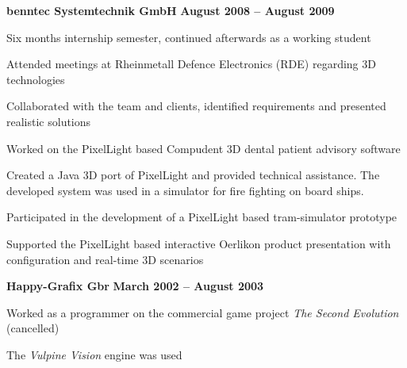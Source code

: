 \documentclass[margin,line]{Ofenberg_Resume}
\begin{document}
\begin{resume}
	\textbf{benntec Systemtechnik GmbH} \hfill \textbf{August 2008 -- August 2009}\vspace{-3mm}\\\vspace{-1mm}%
	\begin{list2}
		\item Six months internship semester, continued afterwards as a working student
		\item Attended meetings at Rheinmetall Defence Electronics (RDE) regarding 3D technologies
		\item Collaborated with the team and clients, identified requirements and presented realistic solutions
		\item Worked on the PixelLight based Compudent 3D dental patient advisory software
		\item Created a Java 3D port of PixelLight and provided technical assistance. The developed system was used in a simulator for fire fighting on board ships.
		\item Participated in the development of a PixelLight based tram-simulator prototype
		\item Supported the PixelLight based interactive Oerlikon product presentation with configuration and real-time 3D scenarios
	\end{list2}\vspace{-1.5mm}
	\textbf{Happy-Grafix Gbr} \hfill \textbf{March 2002 -- August 2003}\vspace{-3mm}\\\vspace{-1mm}%
	\begin{list2}
		\item Worked as a programmer on the commercial game project \emph{The Second Evolution} (cancelled)
		\item The \emph{Vulpine Vision} engine was used
	\end{list2}\vspace{-1.5mm}



\end{resume}
\end{document}
